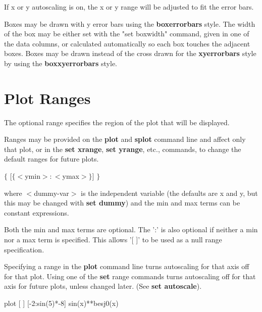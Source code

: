 If x or y autoscaling is on, the x or y range will be adjusted to fit the
error bars.

Boxes may be drawn with y error bars using the {\bf boxerrorbars} style. The
width of the box may be either set with the "set boxwidth" command, given in 
one of the data columns, or calculated automatically so each box touches the 
adjacent boxes.
Boxes may be drawn instead of the cross drawn for the {\bf xyerrorbars} style 
by using the {\bf boxxyerrorbars} style. 


\section{Plot Ranges}
The optional range specifies the region of the plot that will be
displayed.

Ranges may be provided on the {\bf plot} and {\bf splot} command line and
affect only that plot, or in the {\bf set xrange}, {\bf set yrange}, etc.,
commands, to change the default ranges for future plots.

\key{[$\{<$dummy-var$> =\} \{<$xmin$> : <$xmax$>\}$]} { $\{$ [$\{<$ymin$> : <$ymax$>\}$] $\}$}

where $<$dummy-var$>$ is the independent variable (the defaults are x and
y, but this may be changed with {\bf set dummy}) and the min and max
terms can be constant expressions.

Both the min and max terms are optional. The ':' is also optional
if neither a min nor a max term is specified. This allows '[ ]' to
be used as a null range specification.

Specifying a range in the {\bf plot} command line turns autoscaling for
that axis off for that plot. Using one of the {\bf set} range commands
turns autoscaling off for that axis for future plots, unless changed
later. (See {\bf set autoscale}).

 {plot [ ] [-2:sin(5)*-8] sin(x)**besj0(x)}

